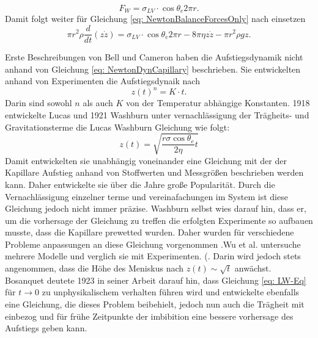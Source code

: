 \begin{equation}
    F_W = \sigma_{LV} \cdot \cos \theta_e 2\pi r.
\end{equation}
Damit folgt weiter für Gleichung \ref{eq: NewtonBalanceForcesOnly} nach einsetzen \cite{fricke2023AnalyticalStudyCapillary}
\begin{equation}
\label{eq: NewtonDynCapillary}
    \pi r^2 \rho \frac{d}{dt} (z \dot{z}) = \sigma_{LV} \cdot \cos \theta_e 2\pi r-8\pi\eta z \dot{z}-\pi r^2 \rho g z.
\end{equation}

Erste Beschreibungen von Bell und Cameron \cite{bell1906FlowLiquidsCapillary} haben die Aufstiegsdynamik nicht anhand von Gleichung \ref{eq: NewtonDynCapillary} beschrieben. Sie entwickelten anhand von Experimenten die Aufstiegsdynaik nach 
\begin{equation}
    z(t)^n = K\cdot t.
\end{equation}
Darin sind sowohl $n$ als auch $K$ von der Temperatur abhängige Konstanten. 1918 entwickelte Lucas \cite{lucas1918UeberZeitgesetzKapillaren} und 1921 Washburn \cite{washburn1921DynamicsCapillaryFlow} unter vernachlässigung der Trägheits- und Gravitationsterme die Lucas Washburn Gleichung wie folgt:
\begin{equation}
\label{eq: LW-Eq}
    z(t) = \sqrt{\frac{r\sigma\cos\theta_e}{2\eta}t}
\end{equation}
Damit entwickelten sie unabhängig voneinander eine Gleichung mit der der Kapillare Aufstieg anhand von Stoffwerten und Messgrößen beschrieben werden kann. Daher entwickelte sie über die Jahre große Popularität. Durch die Vernachlässigung einzelner terme und vereinafachungen im System ist diese Gleichung jedoch nicht immer präzise. Washburn selbst wies darauf hin, dass er, um die vorhersage der Gleichung zu treffen die erfolgten Experimente so aufbauen musste, dass die Kapillare prewetted wurden. 
Daher wurden für verschiedene Probleme anpassungen an diese Gleichung vorgenommen \cite{dimitrov2007CapillaryRiseNanopores}.Wu et al. \cite{wu2017CapillaryRiseValidity} untersuche mehrere Modelle und verglich sie mit Experimenten. 
(. Darin wird jedoch stets angenommen, dass die Höhe des Meniskus nach $z(t)\sim \sqrt{t}$ anwächst.
Bosanquet \cite{bosanquet1923LVFlowLiquids} deutete 1923 in seiner Arbeit darauf hin, dass Gleichung \ref{eq: LW-Eq} für $t\xrightarrow{}0$ zu unphysikalischem verhalten führen wird und entwickelte ebenfalls eine Gleichung, die dieses Problem beibehielt, jedoch nun auch die Trägheit mit einbezog und für frühe Zeitpunkte der imbibition eine bessere vorhersage des Aufstiegs geben kann. 
